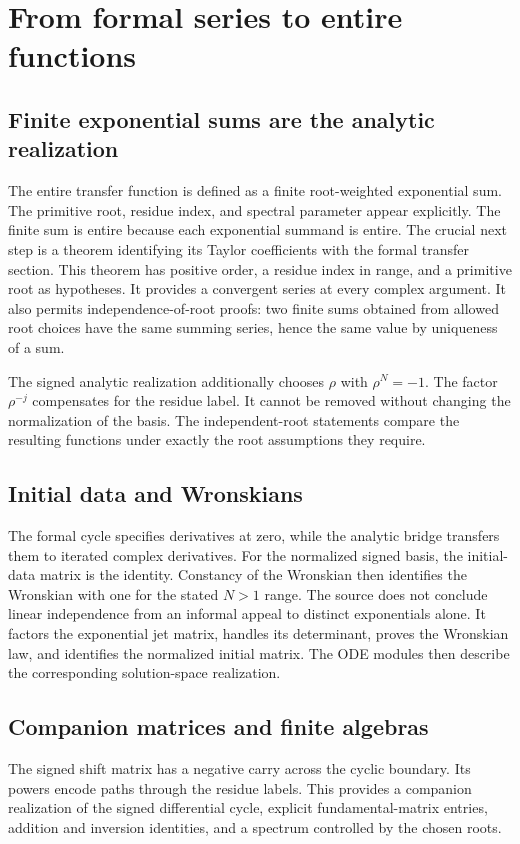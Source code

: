 \section{From formal series to entire functions}
\subsection{Finite exponential sums are the analytic realization}
The entire transfer function is defined as a finite root-weighted exponential sum.
The primitive root, residue index, and spectral parameter appear explicitly. The finite sum is entire because each exponential summand is entire. The crucial next step is a  theorem identifying its Taylor coefficients with the formal transfer section.
This theorem has positive order, a residue index in range, and a primitive root as hypotheses. It provides a convergent series at every complex argument. It also permits independence-of-root proofs: two finite sums obtained from allowed root choices have the same summing series, hence the same value by uniqueness of a sum.

The signed analytic realization additionally chooses $\rho$ with $\rho^N=-1$. The factor $\rho^{-j}$ compensates for the residue label. It cannot be removed without changing the normalization of the basis. The independent-root statements compare the resulting functions under exactly the root assumptions they require.

\subsection{Initial data and Wronskians}
The formal cycle specifies derivatives at zero, while the analytic bridge transfers them to iterated complex derivatives. For the normalized signed basis, the initial-data matrix is the identity. Constancy of the Wronskian then identifies the Wronskian with one for the stated $N>1$ range.
The source does not conclude linear independence from an informal appeal to distinct exponentials alone. It factors the exponential jet matrix, handles its determinant, proves the Wronskian law, and identifies the normalized initial matrix. The ODE modules then describe the corresponding solution-space realization.

\subsection{Companion matrices and finite algebras}
The signed shift matrix has a negative carry across the cyclic boundary. Its powers encode paths through the residue labels. This provides a companion realization of the signed differential cycle, explicit fundamental-matrix entries, addition and inversion identities, and a spectrum controlled by the chosen roots.

